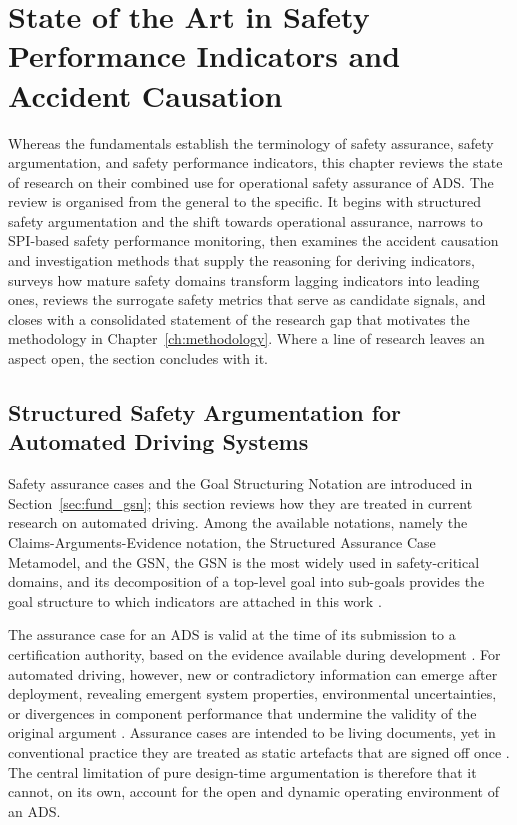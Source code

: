 \chapter[State of the Art]{State of the Art in Safety Performance Indicators and Accident Causation}
\label{ch:sota}

Whereas the fundamentals establish the terminology of safety assurance, safety
argumentation, and safety performance indicators, this chapter reviews the
state of research on their combined use for operational safety
assurance of \ac{ADS}. The review is organised from the general to the specific. It
begins with structured safety argumentation and the shift towards operational
assurance, narrows to \ac{SPI}-based safety performance monitoring, then examines the
accident causation and investigation methods that supply the reasoning for deriving
indicators, surveys how mature safety domains transform lagging indicators into
leading ones, reviews the surrogate safety metrics that serve as candidate signals,
and closes with a consolidated statement of the research gap that motivates the
methodology in Chapter~\ref{ch:methodology}. Where a line of research leaves an
aspect open, the section concludes with it.

\section{Structured Safety Argumentation for Automated Driving Systems}
\label{sec:sota_argumentation}

Safety assurance cases and the Goal Structuring Notation are introduced in
Section~\ref{sec:fund_gsn}; this section reviews how they are treated in current
research on automated driving. Among the available notations, namely the
Claims-Arguments-Evidence notation, the Structured Assurance Case Metamodel, and the
\ac{GSN}, the \ac{GSN} is the most widely used in safety-critical domains, and its
decomposition of a top-level goal into sub-goals provides the goal structure to
which indicators are attached in this work \cite{kelly2004gsn}.

The assurance case for an \ac{ADS} is valid at the time of its submission to a
certification authority, based on the evidence available during development
\cite{laxman2024}. For automated driving, however, new or contradictory information
can emerge after deployment, revealing emergent system properties, environmental
uncertainties, or divergences in component performance that undermine the validity
of the original argument \cite{laxman2025}. Assurance cases are intended to be living
documents, yet in conventional practice they are treated as static artefacts that
are signed off once \cite{laxman2025}. The central limitation of pure design-time
argumentation is therefore that it cannot, on its own, account for the open and
dynamic operating environment of an \ac{ADS}.

